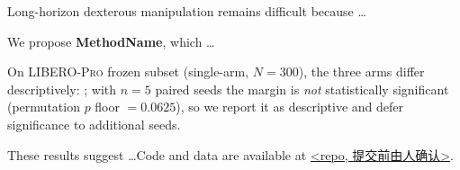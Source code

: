 
Long-horizon dexterous manipulation remains difficult because \ldots

We propose \textbf{MethodName}, which \ldots

On \textsc{LIBERO-Pro} frozen subset (single-arm, $N{=}300$), the three arms
differ descriptively: ; with $n{=}5$
paired seeds the margin is \emph{not} statistically significant (permutation
$p$ floor $=0.0625$), so we report it as descriptive and defer significance to
additional seeds. %

These results suggest \ldots Code and data are available at \url{<repo, 提交前由人确认>}.
